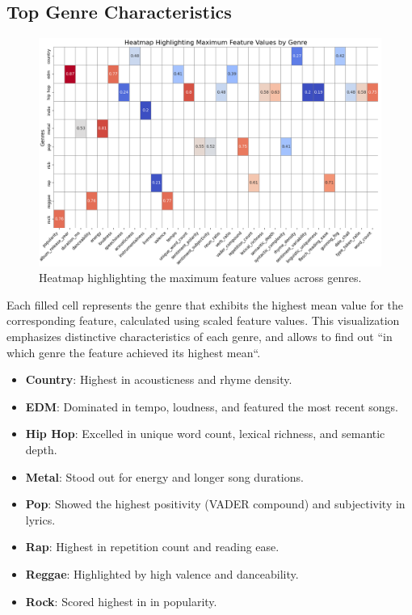 \subsection{Top Genre Characteristics}
\begin{center}
\begin{figure}[H]
  \centering
  \includegraphics[width=6in]{img/heatmap_max_feature_values_by_genre.png}
  \caption{Heatmap highlighting the maximum feature values across genres.}
  \label{Figure:dendrogram_spotify_features}
\end{figure}
\end{center}
Each filled cell represents the genre that exhibits the highest mean value for
the corresponding feature, calculated using scaled feature values. This
visualization emphasizes distinctive characteristics of each genre, and allows
to find out ``in  which genre the feature achieved its highest mean``.

\begin{itemize}
  \item \textbf{Country}: Highest in acousticness and rhyme density.
  \item \textbf{EDM}: Dominated in tempo, loudness, and featured the most
    recent songs.
  \item \textbf{Hip Hop}: Excelled in unique word count, lexical richness, and
    semantic depth.
  \item \textbf{Metal}: Stood out for energy and longer song durations.
  \item \textbf{Pop}: Showed the highest positivity (VADER compound) and
    subjectivity in lyrics.
  \item \textbf{Rap}: Highest in repetition count and reading ease.
  \item \textbf{Reggae}: Highlighted by high valence and danceability.
  \item \textbf{Rock}: Scored highest in in popularity.
    
\end{itemize}

